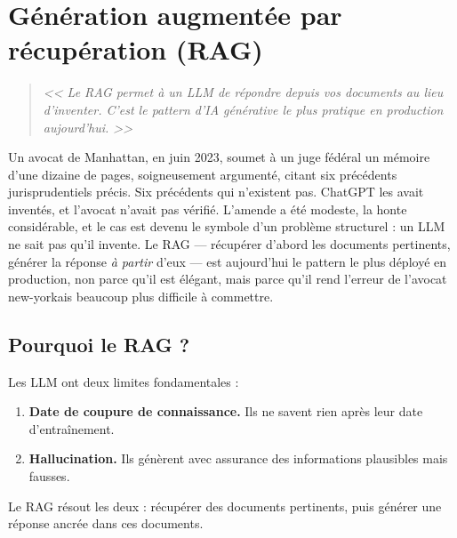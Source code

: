 \chapter{G\'en\'eration augment\'ee par r\'ecup\'eration (RAG)}
\label{ch:rag}

\begin{quote}
\emph{<< Le RAG permet \`a un LLM de r\'epondre depuis vos documents au lieu d'inventer. C'est le pattern d'IA g\'en\'erative le plus pratique en production aujourd'hui. >>}
\end{quote}

Un avocat de Manhattan, en juin 2023, soumet à un juge fédéral un mémoire d'une dizaine de pages, soigneusement argumenté, citant six précédents jurisprudentiels précis. Six précédents qui n'existent pas. ChatGPT les avait inventés, et l'avocat n'avait pas vérifié. L'amende a été modeste, la honte considérable, et le cas est devenu le symbole d'un problème structurel : un LLM ne sait pas qu'il invente. Le RAG --- récupérer d'abord les documents pertinents, générer la réponse \emph{à partir} d'eux --- est aujourd'hui le pattern le plus déployé en production, non parce qu'il est élégant, mais parce qu'il rend l'erreur de l'avocat new-yorkais beaucoup plus difficile à commettre.
\section{Pourquoi le RAG ?}

Les LLM ont deux limites fondamentales :
\begin{enumerate}
  \item \textbf{Date de coupure de connaissance.} Ils ne savent rien apr\`es leur date d'entra\^inement.
  \item \textbf{Hallucination.} Ils g\'en\`erent avec assurance des informations plausibles mais fausses.
\end{enumerate}

Le RAG r\'esout les deux : r\'ecup\'erer des documents pertinents, puis g\'en\'erer une r\'eponse ancr\'ee dans ces documents.

